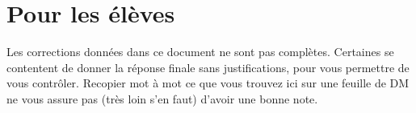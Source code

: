 


\section*{Pour les élèves}

Les corrections données dans ce document ne sont pas complètes. Certaines se contentent de donner la réponse finale sans justifications, pour vous permettre de vous contrôler. Recopier mot à mot ce que vous trouvez ici sur une feuille de DM ne vous assure pas (très loin s'en faut) d'avoir une bonne note.
